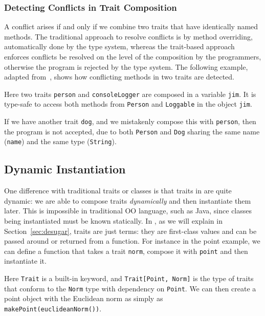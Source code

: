 \subsubsection{Detecting Conflicts in Trait Composition}

A conflict arises if and only if we combine two traits that have identically
named methods. The traditional approach to resolve conflicts is by method
overriding, automatically done by the type system, whereas the trait-based
approach enforces conflicts be resolved on the level of the composition by the
programmers, otherwise the program is rejected by the type system. The following
example, adapted from~\citet{alpuimdisjoint}, shows how conflicting methods in
two traits are detected.


Here two traits \lstinline{person} and \lstinline{consoleLogger} are composed in
a variable \lstinline{jim}. It is type-safe to access both methods from
\lstinline{Person} and \lstinline{Loggable} in the object \lstinline{jim}.

If we have another trait \lstinline{dog}, and we mistakenly compose this with
\lstinline$person$, then the program is not accepted, due to both
\lstinline{Person} and \lstinline{Dog} sharing the same name (\lstinline{name})
and the same type (\lstinline$String$).



\subsection{Dynamic Instantiation}

One difference with traditional traits or classes is that traits in \name are
quite dynamic: we are able to compose traits \textit{dynamically} and then
instantiate them later. This is impossible in traditional OO language, such as
Java, since classes being instantiated must be known statically. In \name, as we
will explain in Section~\ref{sec:desugar}, traits are just terms: they are
first-class values and can be passed around or returned from a function. For
instance in the point example, we can define a function that takes a trait
\lstinline$norm$, compose it with \lstinline{point} and then instantiate it.

Here \lstinline{Trait} is a built-in keyword, and \lstinline$Trait[Point, Norm]$
is the type of traits that conform to the \lstinline$Norm$ type with dependency
on \lstinline$Point$. We can then create a point object with the Euclidean norm
as simply as \lstinline$makePoint(euclideanNorm())$.




